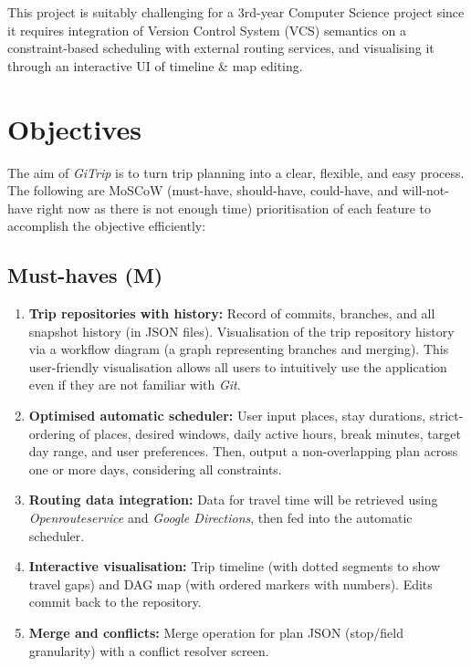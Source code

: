 \documentclass{article}
\begin{document}
This project is suitably challenging for a 3rd-year Computer Science project since it requires integration of Version Control System (VCS) semantics on a constraint-based scheduling with external routing services, and visualising it through an interactive UI of timeline \& map editing.

\section{Objectives}

The aim of \textit{GiTrip} is to turn trip planning into a clear, flexible, and easy process. The following are MoSCoW (must-have, should-have, could-have, and will-not-have right now as there is not enough time) prioritisation of each feature to accomplish the objective efficiently:

\subsection*{Must-haves (M)}
\begin{enumerate}[label=\textbf{M\arabic*}]
  \item \textbf{Trip repositories with history:} Record of commits, branches, and all snapshot history (in JSON files). Visualisation of the trip repository history via a workflow diagram (a graph representing branches and merging). This user-friendly visualisation allows all users to intuitively use the application even if they are not familiar with \textit{Git}.
  \item \textbf{Optimised automatic scheduler:} User input places, stay durations, strict-ordering of places, desired windows, daily active hours, break minutes, target day range, and user preferences. Then, output a non-overlapping plan across one or more days, considering all constraints.
  \item \textbf{Routing data integration:} Data for travel time will be retrieved using \textit{Openrouteservice} and \textit{Google Directions}, then fed into the automatic scheduler.
  \item \textbf{Interactive visualisation:} Trip timeline (with dotted segments to show travel gaps) and DAG map (with ordered markers with numbers). Edits commit back to the repository.
  \item \textbf{Merge and conflicts:} Merge operation for plan JSON (stop/field granularity) with a conflict resolver screen.
\end{enumerate}
\end{document}
